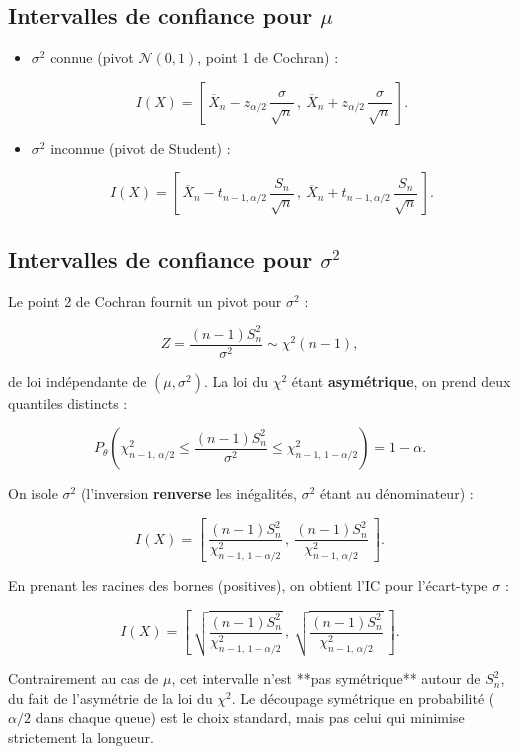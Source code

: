 \subsection{Intervalles de confiance pour $\mu$}

\begin{itemize}
\item $\sigma^2$ connue (pivot $\mathcal N(0,1)$, point 1 de Cochran) :

$$
I(X) = \left[\,\overline X_n - z_{\alpha/2}\,\frac{\sigma}{\sqrt n}\,,\ \overline X_n + z_{\alpha/2}\,\frac{\sigma}{\sqrt n}\,\right].
$$

\item $\sigma^2$ inconnue (pivot de Student) :

$$
I(X) = \left[\,\overline X_n - t_{n-1,\alpha/2}\,\frac{S_n}{\sqrt n}\,,\ \overline X_n + t_{n-1,\alpha/2}\,\frac{S_n}{\sqrt n}\,\right].
$$
\end{itemize}

\subsection{Intervalles de confiance pour $\sigma^2$}

Le point 2 de Cochran fournit un pivot pour $\sigma^2$ :

$$
Z = \frac{(n-1)S_n^2}{\sigma^2} \sim \chi^2(n-1),
$$

de loi indépendante de $(\mu,\sigma^2)$. La loi du $\chi^2$ étant \textbf{asymétrique}, on prend deux quantiles distincts :

$$
P_\theta\!\left(\chi^2_{n-1,\,\alpha/2} \le \frac{(n-1)S_n^2}{\sigma^2} \le \chi^2_{n-1,\,1-\alpha/2}\right) = 1-\alpha.
$$

On isole $\sigma^2$ (l'inversion \textbf{renverse} les inégalités, $\sigma^2$ étant au dénominateur) :

$$
\boxed{\ I(X) = \left[\ \frac{(n-1)S_n^2}{\chi^2_{n-1,\,1-\alpha/2}}\,,\ \frac{(n-1)S_n^2}{\chi^2_{n-1,\,\alpha/2}}\ \right].\ }
$$

En prenant les racines des bornes (positives), on obtient l'IC pour l'écart-type $\sigma$ :

$$
I(X) = \left[\ \sqrt{\frac{(n-1)S_n^2}{\chi^2_{n-1,\,1-\alpha/2}}}\,,\ \sqrt{\frac{(n-1)S_n^2}{\chi^2_{n-1,\,\alpha/2}}}\ \right].
$$

\begin{remarque}
Contrairement au cas de $\mu$, cet intervalle n'est **pas symétrique** autour de $S_n^2$, du fait de l'asymétrie de la loi du $\chi^2$. Le découpage symétrique en probabilité ($\alpha/2$ dans chaque queue) est le choix standard, mais pas celui qui minimise strictement la longueur.
\end{remarque}
